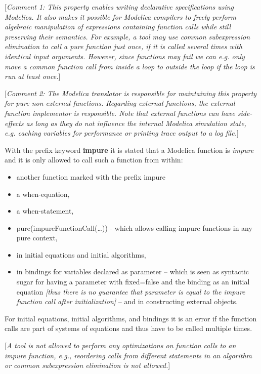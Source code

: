 \documentclass[10pt,a4paper]{report}
\begin{document}
{[}\emph{Comment 1: This property enables writing declarative
specifications using Modelica. It also makes it possible for Modelica
compilers to freely perform algebraic manipulation of expressions
containing function calls while still preserving their semantics. For
example, a tool may use common subexpression elimination to call a pure
function just once, if it is called several times with identical input
arguments. However, since functions may fail we can e.g. only move a
common function call from inside a loop to outside the loop if the loop
is run at least once.}{]}

{[}\emph{Comment 2: The Modelica translator is responsible for
maintaining this property for pure non-external functions. Regarding
external functions, the external function implementor is responsible.
Note that external functions can have side-effects as long as they do
not influence the internal Modelica simulation state, e.g. caching
variables for performance or printing trace output to a log file.}{]}

With the prefix keyword \textbf{impure} it is stated that a Modelica
function is \emph{impure} and it is only allowed to call such a function
from within:

\begin{itemize}
\item
  another function marked with the prefix impure
\item
  a when-equation,
\item
  a when-statement,
\item
  pure(impureFunctionCall(\ldots{})) - which allows calling impure
  functions in any pure context,
\item
  in initial equations and initial algorithms,
\item
  in bindings for variables declared as parameter -- which is seen as
  syntactic sugar for having a parameter with fixed=false and the
  binding as an initial equation \emph{{[}thus there is no guarantee
  that parameter is equal to the impure function call after
  initialization{]}} -- and in constructing external objects.
\end{itemize}

For initial equations, initial algorithms, and bindings it is an error
if the function calls are part of systems of equations and thus have to
be called multiple times.

{[}\emph{A tool is not allowed to perform any optimizations on function
calls to an impure function, e.g., reordering calls from different
statements in an algorithm or common subexpression elimination is not
allowed.}{]}
\end{document}

